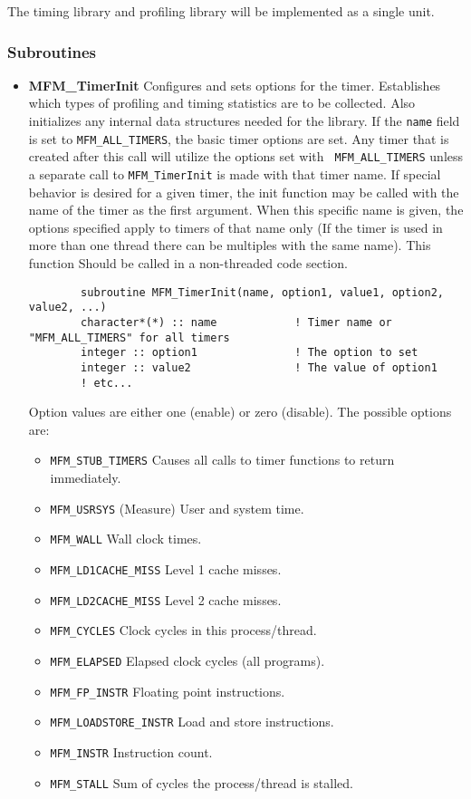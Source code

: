 The timing library and profiling library will be implemented as a single unit.  
\subsubsection{Subroutines}

\begin{itemize}
\item{\bf MFM\_TimerInit}
Configures and sets options for the timer.  Establishes which types of
profiling and timing statistics are to be collected.  Also initializes any
internal data structures needed for the library.  If the {\tt name} field is 
set to {\tt MFM\_ALL\_TIMERS}, the basic timer options are set.  Any timer that
is created after this call will utilize the options set with {\tt
MFM\_ALL\_TIMERS} unless a separate call to {\tt MFM\_TimerInit} is made with
that timer name.  If special behavior is desired for a given timer, the init
function may be called with the name of the timer as the first argument.  When
this specific name is
given, the options specified apply to timers of that name only (If the timer is
used in more than one thread there can be multiples with the same name).  This 
function Should be called in a non-threaded code section.

\begin{verbatim}
        subroutine MFM_TimerInit(name, option1, value1, option2, value2, ...)
        character*(*) :: name            ! Timer name or "MFM_ALL_TIMERS" for all timers
        integer :: option1               ! The option to set
        integer :: value2                ! The value of option1
        ! etc...
\end{verbatim}

Option values are either one (enable) or zero (disable).  The possible options
are:
\begin{itemize}
\item{\tt MFM\_STUB\_TIMERS} Causes all calls to timer functions to return immediately.
\item{\tt MFM\_USRSYS} (Measure) User and system time.
\item{\tt MFM\_WALL} Wall clock times.
\item{\tt MFM\_LD1CACHE\_MISS} Level 1 cache misses.
\item{\tt MFM\_LD2CACHE\_MISS} Level 2 cache misses.
\item{\tt MFM\_CYCLES} Clock cycles in this process/thread.
\item{\tt MFM\_ELAPSED} Elapsed clock cycles (all programs).
\item{\tt MFM\_FP\_INSTR} Floating point instructions.
\item{\tt MFM\_LOADSTORE\_INSTR} Load and store instructions.
\item{\tt MFM\_INSTR} Instruction count.
\item{\tt MFM\_STALL} Sum of cycles the process/thread is stalled.


\end{itemize}
\end{itemize}
